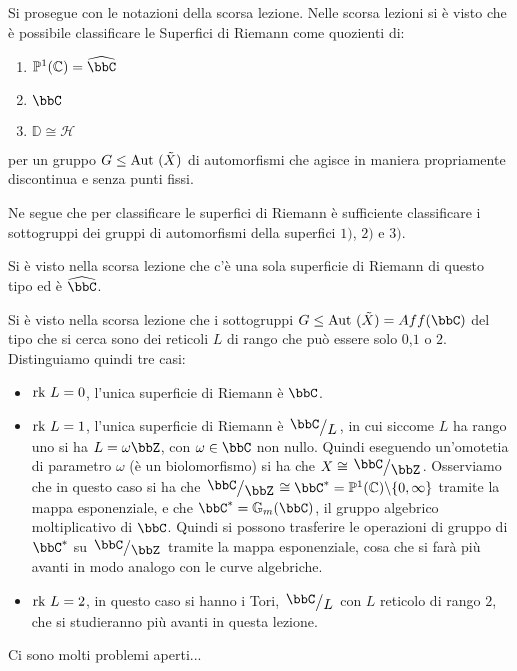 
Si prosegue con le notazioni della scorsa lezione.
Nelle scorsa lezioni si è visto che è possibile classificare le Superfici di Riemann come quozienti di:
\begin{enumerate}
\item $\mathbb{P}^1(\mathbb{C})=\hat{\bbC}$
\item $\bbC$
\item $\mathbb{D} \cong \mathcal{H}$
\end{enumerate}
per un gruppo $G\le\text{Aut }(\tilde{X})$ di automorfismi che agisce in maniera propriamente discontinua e senza punti fissi.

Ne segue che per classificare le superfici di Riemann è sufficiente classificare i sottogruppi dei gruppi di automorfismi della superfici $1)$, $2)$ e $3)$.

 Si è visto nella scorsa lezione che c'è una sola superficie di Riemann di questo tipo ed è $\hat{\bbC}$.

 Si è visto nella scorsa lezione che i sottogruppi $G\le\Aut(\tilde{X})=Aff(\bbC)$ del tipo che si cerca sono dei reticoli $L$ di rango che può essere solo $0$,$1$ o $2$. Distinguiamo quindi tre casi:
\begin{itemize}
\item $\mbox{rk } L=0$, l'unica superficie di Riemann è $\bbC$.
\item $\mbox{rk } L=1$, l'unica superficie di Riemann è $\quotient{\bbC}{L}$, in cui siccome $L$ ha rango uno si ha $L=\omega \bbZ$, con $\omega\in\bbC$ non nullo. Quindi eseguendo un'omotetia di parametro $\omega$ (è un biolomorfismo) si ha che $X\cong \quotient{\bbC}{\bbZ}$.
Osserviamo che in questo caso si ha che $\quotient{\bbC}{\bbZ}\cong \bbC^{*}=\mathbb{P}^1(\mathbb{C})\minus\{0,\infty\}$ tramite la mappa esponenziale, e che $\bbC^{*}=\mathbb{G}_m(\bbC)$, il gruppo algebrico moltiplicativo di $\bbC$. Quindi si possono trasferire le operazioni di gruppo di $\bbC^{*}$ su $\quotient{\bbC}{\bbZ}$ tramite la mappa esponenziale, cosa che si farà più avanti in modo analogo con le curve algebriche.
\item $\mbox{rk } L=2$, in questo caso si hanno i Tori, $\quotient{\bbC}{L}$ con $L$ reticolo di rango $2$, che si studieranno più avanti in questa lezione.
\end{itemize}
 Ci sono molti problemi aperti...

